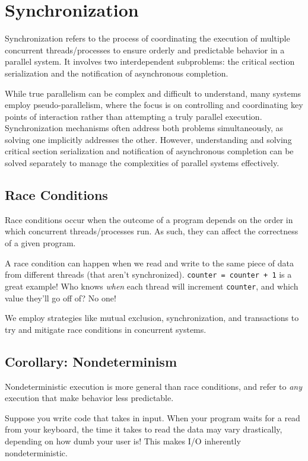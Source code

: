 \documentclass{report}
\newcommand{\exampleBegin}[1]{\begin{tcolorbox}[colback=blue!5!white,colframe=black!75!blue,title={Example:
      #1}]}
\newcommand{\exampleEnd}{\end{tcolorbox}}
\begin{document}
\chapter{Synchronization}
Synchronization refers to the process of coordinating the execution of multiple concurrent
threads/processes to ensure orderly and predictable behavior in a parallel system. It involves two
interdependent subproblems: the critical section serialization and the notification of asynchronous
completion.

While true parallelism can be complex and difficult to understand, many systems employ
pseudo-parallelism, where the focus is on controlling and coordinating key points of interaction
rather than attempting a truly parallel execution. Synchronization mechanisms often address both
problems simultaneously, as solving one implicitly addresses the other. However,
understanding and solving critical section serialization and notification of asynchronous completion
can be solved separately to manage the complexities of parallel systems effectively. 





\section{Race Conditions}
Race conditions occur when the outcome of a program depends on the order in which concurrent
threads/processes run. As such, they can affect the correctness of a given program.

\exampleBegin{No I Wrote First!}
A race condition can happen when we read and write to the same piece of data from different threads
(that aren't synchronized). \texttt{counter = counter + 1} is a great example! Who knows
\textit{when} each thread will increment \texttt{counter}, and which value they'll go off of? No one!
\exampleEnd

We employ strategies like mutual exclusion, synchronization, and transactions to try and mitigate
race conditions in concurrent systems.


\section*{Corollary: Nondeterminism}
Nondeterministic execution is more general than race conditions, and refer to \textit{any} execution
that make behavior less predictable.

\exampleBegin{I/O}
Suppose you write code that takes in input. When your program waits for a read from your keyboard,
the time it takes to read the data may vary drastically, depending on how dumb your user is! This
makes I/O inherently nondeterministic.
\exampleEnd
\end{document}
